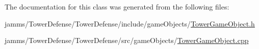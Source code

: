 The documentation for this class was generated from the following files\+:\begin{DoxyCompactItemize}
\item 
jamms/\+Tower\+Defense/\+Tower\+Defense/include/game\+Objects/\hyperlink{_tower_game_object_8h}{Tower\+Game\+Object.\+h}\item 
jamms/\+Tower\+Defense/\+Tower\+Defense/src/game\+Objects/\hyperlink{_tower_game_object_8cpp}{Tower\+Game\+Object.\+cpp}\end{DoxyCompactItemize}
